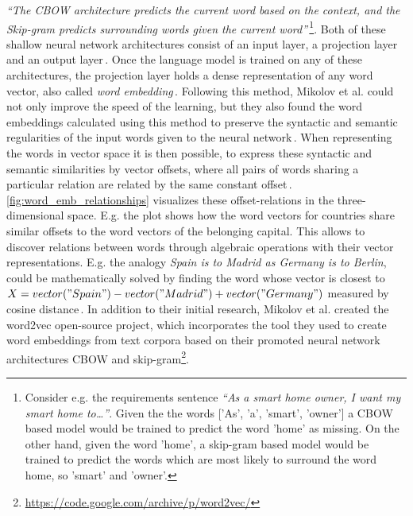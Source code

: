 \textit{``The CBOW architecture predicts the current word based on the context, and the Skip-gram predicts surrounding words given the current word''}\,\cite{mikolov_efficient_2013}\footnote{Consider e.g. the requirements sentence \textit{``As a smart home owner, I want my smart home to\dots''}. Given the the words ['As', 'a', 'smart', 'owner'] a CBOW based model would be trained to predict the word 'home' as missing. On the other hand, given the word 'home', a skip-gram based model would be trained to predict the words which are most likely to surround the word home, so 'smart' and 'owner'.}. Both of these shallow neural network architectures consist of an input layer, a projection layer and an output layer\,\cite{mikolov_efficient_2013,qiang_topic_2016}. Once the language model is trained on any of these architectures, the projection layer holds a dense representation of any word vector, also called \textit{word embedding}\,\cite{tensorflow_word_embeddings}. Following this method, Mikolov et al. could not only improve the speed of the learning, but they also found the word embeddings calculated using this method to preserve the syntactic and semantic regularities of the input words given to the neural network\,\cite{mikolov_linguistic_2013}. When representing the words in vector space it is then possible, to express these syntactic and semantic similarities by vector offsets, where all pairs of words sharing a particular relation are related by the same constant offset\,\cite{mikolov_linguistic_2013}. \autoref{fig:word_emb_relationships} visualizes these offset-relations in the three-dimensional space. E.g. the  plot shows how the word vectors for countries share similar offsets to the word vectors of the belonging capital. This allows to discover relations between words through algebraic operations with their vector representations. E.g. the analogy \textit{Spain is to Madrid as Germany is to Berlin}, could be mathematically solved by finding the word whose vector is closest to $X = vector("Spain") - vector("Madrid") + vector("Germany")$ measured by cosine distance\,\cite{mikolov_efficient_2013}. In addition to their initial research, Mikolov et al. created the word2vec open-source project, which incorporates the tool they used to create word embeddings from text corpora based on their promoted neural network architectures CBOW and skip-gram\footnote{\label{word2vec_link}\url{https://code.google.com/archive/p/word2vec/}}.

